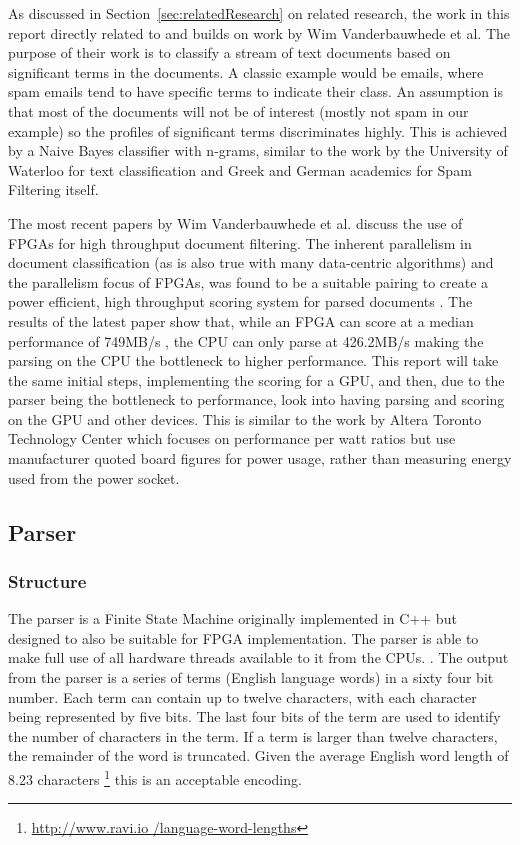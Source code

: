 As discussed in Section~\ref{sec:relatedResearch} on related research, the work
in this report directly related to and builds on work by Wim Vanderbauwhede et
al. The purpose of their work is to classify a stream of text documents based on
significant terms in the documents. A classic example would be emails, where
spam emails tend to have specific terms to indicate their class. An assumption
is that most of the documents will not be of interest (mostly not spam in our
example) so the profiles of significant terms discriminates highly. This is
achieved by a Naive Bayes classifier with n-grams, similar to the work by the
University of Waterloo \cite{peng2003combining} for text classification and
Greek \cite{metsis2006spam} and German \cite{Schneider:2003:CEM:1067807.1067848}
academics for Spam Filtering itself.

The most recent papers by Wim Vanderbauwhede et al. discuss the use of FPGAs for
high throughput document filtering. The inherent parallelism in document
classification (as is also true with many data-centric algorithms) and the
parallelism focus of FPGAs, was found to be a suitable pairing to create a power
efficient, high throughput scoring system for parsed documents
\cite{vanderbauwhede2013high} \cite{HybridCPUFPGA}. The results of the latest
paper show that, while an FPGA can score at a median performance of 749MB/s
\cite{vanderbauwhede2013high}, the CPU can only parse at 426.2MB/s making the
parsing on the CPU the bottleneck to higher performance. This report will take
the same initial steps, implementing the scoring for a GPU, and then, due to the
parser being the bottleneck to performance, look into having parsing and scoring
on the GPU and other devices. This is similar to the work by Altera Toronto
Technology Center which focuses on performance per watt ratios
\cite{chen2012invited} but use manufacturer quoted board figures for power
usage, rather than measuring energy used from the power socket.

\subsection{Parser}

\subsubsection{Structure}

The parser is a Finite State Machine originally implemented in C++ but designed
to also be suitable for FPGA implementation. The parser is able to make full use
of all hardware threads available to it from the CPUs. \cite{HybridCPUFPGA}. The
output from the parser is a series of terms (English language words) in a sixty
four bit number. Each term can contain up to twelve characters, with each
character being represented by five bits. The last four bits of the term are
used to identify the number of characters in the term. If a term is larger than
twelve characters, the remainder of the word is truncated. Given the average
English word length of 8.23 characters \footnote{\url{http://www.ravi.io
/language-word-lengths}} this is an acceptable encoding.

